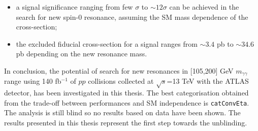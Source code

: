 \documentclass[a4paper, oneside, 11pt]{book}
\begin{document}
	\begin{itemize}
		\item a signal significance ranging from few $\sigma$ to $\sim12\sigma$ can be achieved in the search for new spin-0 resonance, assuming the SM mass dependence of the cross-section;
		\item the excluded fiducial cross-section for a signal ranges from $\sim 3.4$ pb to $\sim 34.6$ pb depending on the new resonance mass.
	\end{itemize}

	In conclusion, the potential of search for new resonances in [105,200] GeV $m_{\gamma\gamma}$ range using 140 fb$^{-1}$ of $pp$ collisions collected at $\sqrt{s}$=13 TeV with the ATLAS detector, has been investigated in this thesis. The best categorisation obtained from the trade-off between performances and SM independence is \texttt{catConvEta}. The analysis is still blind so no results based on data have been shown. The results presented in this thesis represent the first step towards the unblinding.%
	
	
	
\end{document}

